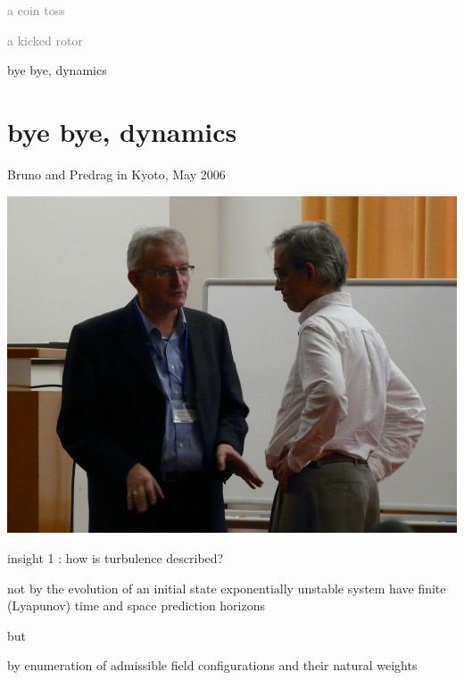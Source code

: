 \begin{frame}{}
\begin{enumerate}
              \item \textcolor{gray}{\small
a coin toss
              \item
a kicked rotor
              \item
\catlatt
                  }
              \item {\Large
bye bye, dynamics
                    }
            \end{enumerate}
\end{frame}

\section[bye bye, dynamics]
 {bye bye, dynamics}
\label{s:byeDynamics}

\begin{frame}{Bruno and Predrag in Kyoto, May 2006}
\begin{center}
\hfill\includegraphics[width=1.00\textheight]{111130PC-EckhardtKyoto}
\end{center}
\end{frame}

\begin{frame}{insight 1 : how is turbulence described?}
\begin{block}{not by the evolution of an initial state}
exponentially unstable system have finite (Lyapunov) time and
space prediction horizons
\end{block}
but
\bigskip

\begin{block}{by enumeration of admissible field configurations}
and their natural weights
\end{block}
\end{frame}

